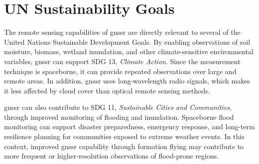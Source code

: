 \clearpage
\section{UN Sustainability Goals}

The remote sensing capabilities of \gls{gnssr} are directly relevant to several of the United Nations Sustainable Development Goals. By enabling observations of soil moisture, biomass, wetland inundation, and other climate-sensitive environmental variables, \gls{gnssr} can support SDG 13, \textit{Climate Action}. Since the measurement technique is spaceborne, it can provide repeated observations over large and remote areas. In addition, \gls{gnssr} uses long-wavelength radio signals, which makes it less affected by cloud cover than optical remote sensing methods.

\gls{gnssr} can also contribute to SDG 11, \textit{Sustainable Cities and Communities}, through improved monitoring of flooding and inundation. Spaceborne flood monitoring can support disaster preparedness, emergency response, and long-term resilience planning for communities exposed to extreme weather events. In this context, improved \gls{gnssr} capability through formation flying may contribute to more frequent or higher-resolution observations of flood-prone regions.




